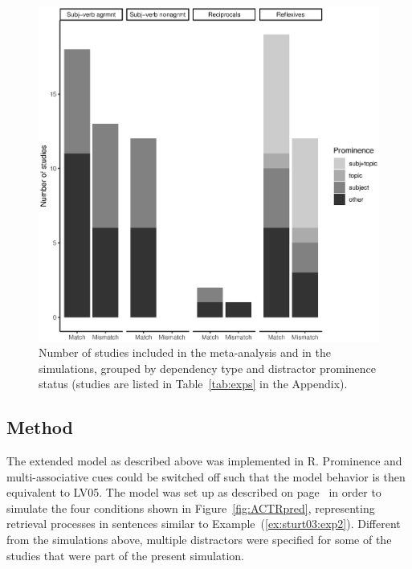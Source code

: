 \documentclass{cambridge7A}\usepackage[]{graphicx}\usepackage[]{color}
\newenvironment{knitrout}{}{} %
\newcommand{\R}{\textsf{R}}
\begin{document}
\begin{figure}[htbp]
\centering
\begin{knitrout}
\color{fgcolor}

{\centering \includegraphics[width=\textwidth]{figures/fig-datsumfig-1} 

}



\end{knitrout}
\caption{Number of studies included in the \cite{JaegerEngelmannVasishth2017} meta-analysis and in the simulations, grouped by dependency type and distractor prominence status (studies are listed in Table~\ref{tab:exps} in the Appendix).}
\label{fig:datasummary}
\end{figure}

\subsection{Method}

The extended model as described above was implemented in \R{}. Prominence and multi-associative cues could be switched off such that the model behavior is then equivalent to LV05.
The model was set up as described on page~\pageref{sec:generalmethods} in order to simulate the four conditions shown in Figure~\ref{fig:ACTRpred}, representing retrieval processes in sentences similar to Example~(\ref{ex:sturt03:exp2}). 
Different from the simulations above, multiple distractors were specified for some of the studies that were part of the present simulation. 
\end{document}
